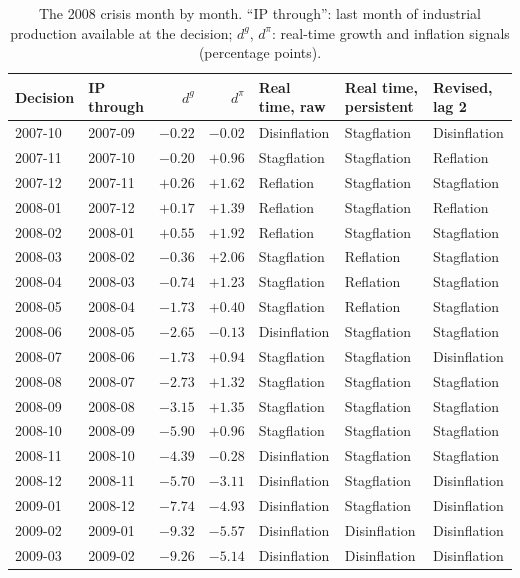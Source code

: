 \documentclass[11pt,a4paper]{article}
\begin{document}
\begin{table}[htbp]
\centering
\caption{The 2008 crisis month by month. ``IP through'': last month of industrial production available at the
decision; $d^g$, $d^\pi$: real-time growth and inflation signals (percentage points).}
\label{tab:2008}
\footnotesize
\setlength{\tabcolsep}{4pt}
\begin{tabular}{@{}llrrlll@{}}
\toprule
Decision & IP through & $d^g$ & $d^\pi$ & Real time, raw & Real time, persistent & Revised, lag 2 \\
\midrule
2007-10 & 2007-09 & $-0.22$ & $-0.02$ & Disinflation & Stagflation & Disinflation \\
2007-11 & 2007-10 & $-0.20$ & $+0.96$ & Stagflation & Stagflation & Reflation \\
2007-12 & 2007-11 & $+0.26$ & $+1.62$ & Reflation & Stagflation & Stagflation \\
2008-01 & 2007-12 & $+0.17$ & $+1.39$ & Reflation & Stagflation & Reflation \\
2008-02 & 2008-01 & $+0.55$ & $+1.92$ & Reflation & Stagflation & Stagflation \\
2008-03 & 2008-02 & $-0.36$ & $+2.06$ & Stagflation & Reflation & Stagflation \\
2008-04 & 2008-03 & $-0.74$ & $+1.23$ & Stagflation & Reflation & Stagflation \\
2008-05 & 2008-04 & $-1.73$ & $+0.40$ & Stagflation & Reflation & Stagflation \\
2008-06 & 2008-05 & $-2.65$ & $-0.13$ & Disinflation & Stagflation & Stagflation \\
2008-07 & 2008-06 & $-1.73$ & $+0.94$ & Stagflation & Stagflation & Disinflation \\
2008-08 & 2008-07 & $-2.73$ & $+1.32$ & Stagflation & Stagflation & Stagflation \\
2008-09 & 2008-08 & $-3.15$ & $+1.35$ & Stagflation & Stagflation & Stagflation \\
2008-10 & 2008-09 & $-5.90$ & $+0.96$ & Stagflation & Stagflation & Stagflation \\
2008-11 & 2008-10 & $-4.39$ & $-0.28$ & Disinflation & Stagflation & Stagflation \\
2008-12 & 2008-11 & $-5.70$ & $-3.11$ & Disinflation & Stagflation & Disinflation \\
2009-01 & 2008-12 & $-7.74$ & $-4.93$ & Disinflation & Stagflation & Disinflation \\
2009-02 & 2009-01 & $-9.32$ & $-5.57$ & Disinflation & Disinflation & Disinflation \\
2009-03 & 2009-02 & $-9.26$ & $-5.14$ & Disinflation & Disinflation & Disinflation \\
\bottomrule
\end{tabular}
\end{table}
\end{document}
